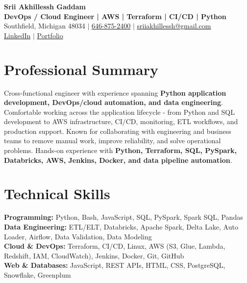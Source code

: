 \documentclass[letterpaper,10pt]{article}
\begin{document}
\fontsize{9.35pt}{10.45pt}\selectfont

\begin{center}
    {\LARGE \textbf{Srii Akhillessh Gaddam}} \\[-1pt]
    \textbf{DevOps / Cloud Engineer | AWS | Terraform | CI/CD | Python} \\[2pt]
    Southfield, Michigan 48034 $|$
    \href{tel:6468752400}{646-875-2400} $|$
    \href{mailto:sriiakhillessh@gmail.com}{sriiakhillessh@gmail.com} \\[1pt]
    \href{https://www.linkedin.com/in/srii-akhiilessh-gaddam-b48668191/}{LinkedIn} $|$
    \href{https://sriiakhillesshg.github.io/portfolio/}{Portfolio}
\end{center}
\vspace{-8pt}

\section{Professional Summary}
\small{Cross-functional engineer with experience spanning \textbf{Python application development, DevOps/cloud automation, and data engineering}. Comfortable working across the application lifecycle - from Python and SQL development to AWS infrastructure, CI/CD, monitoring, ETL workflows, and production support. Known for collaborating with engineering and business teams to remove manual work, improve reliability, and solve operational problems. Hands-on experience with \textbf{Python, Terraform, SQL, PySpark, Databricks, AWS, Jenkins, Docker, and data pipeline automation}.}

\section{Technical Skills}
\small{
\textbf{Programming:} Python, Bash, JavaScript, SQL, PySpark, Spark SQL, Pandas \\
\textbf{Data Engineering:} ETL/ELT, Databricks, Apache Spark, Delta Lake, Auto Loader, Airflow, Data Validation, Data Modeling \\
\textbf{Cloud \& DevOps:} Terraform, CI/CD, Linux, AWS (S3, Glue, Lambda, Redshift, IAM, CloudWatch), Jenkins, Docker, Git, GitHub \\
\textbf{Web \& Databases:} JavaScript, REST APIs, HTML, CSS, PostgreSQL, Snowflake, Greenplum
}
\end{document}
